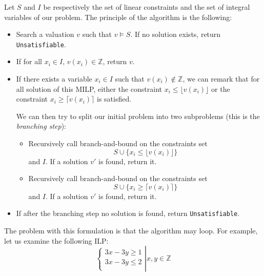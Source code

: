 \documentclass{article}
\newcommand{\cunsat}{\texttt{Unsatisfiable}}
\newcommand{\ints}{\mathbb{Z}}
\begin{document}
Let $S$ and $I$ be respectively the set of linear constraints and the set of
integral variables of our problem. The principle of the algorithm is the
following:
\begin{itemize}
  \item Search a valuation $v$ such that $v \vDash S$. If no solution exists,
    return \cunsat{}.
  \item If for all $x_i \in I$, $v(x_i) \in \ints$,  return $v$.
  \item If there exists a variable $x_i \in I$ such that
    $v(x_i) \notin \ints$, we can remark that for all solution of this
    MILP, either the constraint $x_i \leqslant \lfloor v(x_i) \rfloor$ 
    or the constraint $x_i \geqslant \lceil v(x_i) \rceil$ is satisfied.
    
    We can then try to split our initial problem into two subproblems (this is
    the \textit{branching step}):
    \begin{itemize}
      \item Recursively call branch-and-bound on the constraints set
        $$S \cup \{x_i \leqslant \lfloor v(x_i) \rfloor\}$$ and $I$.
        If a solution $v'$ is found, return it.
      \item Recursively call branch-and-bound on the constraints set
        $$S \cup \{x_i \geqslant \lceil v(x_i) \rceil\}$$ and $I$.
        If a solution $v'$ is found, return it.
    \end{itemize}
  \item If after the branching step no solution is found, return \cunsat{}.
\end{itemize}

%

The problem with this formulation is that the algorithm may loop. For example,
let us examine the following ILP:
\begin{equation} \label{pbloop}
  \left\{
  \begin{array}{l}
    3x - 3y \geqslant 1 \\
    3x - 3y \leqslant 2 \\
  \end{array}
  \right|
  x, y \in \ints
\end{equation}
\end{document}
